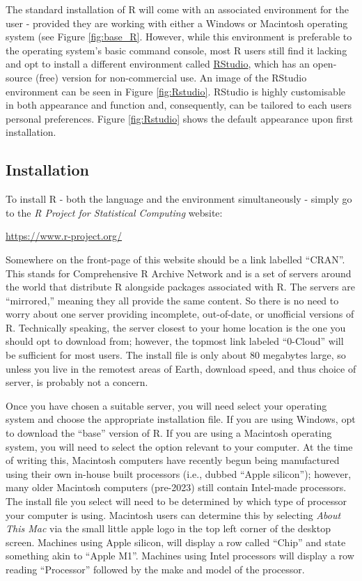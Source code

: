 The standard installation of R will come with an associated environment for the user - provided they are working with either a Windows or Macintosh operating system (see Figure \ref{fig:base_R}.  However, while this environment is preferable to the operating system's basic command console, most R users still find it lacking and opt to install a different environment called \href{https://posit.co/}{\gls{RStudio}}, which has an open-source (free) version for non-commercial use. An image of the RStudio environment can be seen in Figure \ref{fig:Rstudio}. RStudio is highly customisable in both appearance and function and, consequently, can be tailored to each users personal preferences. Figure \ref{fig:Rstudio} shows the default appearance upon first installation.

\subsection{Installation}
\label{sec:install}

To install R - both the language and the environment simultaneously - simply go to the \textit{R Project for Statistical Computing} website: 

\begin{center}
\url{https://www.r-project.org/}
\end{center}

\noindent
Somewhere on the front-page of this website should be a link labelled ``\acrshort{CRAN}''. This stands for \gls{Comprehensive R Archive Network} and is a set of servers around the world that distribute R alongside packages associated with R.  The servers are ``mirrored,'' meaning they all provide the same content.  So there is no need to worry about one server providing incomplete, out-of-date, or unofficial versions of R.  Technically speaking, the server closest to your home location is the one you should opt to download from; however, the topmost link labeled ``0-Cloud'' will be sufficient for most users.  The install file is only about 80 megabytes large, so unless you live in the remotest areas of Earth, download speed, and thus choice of server, is probably not a concern.

Once you have chosen a suitable server, you will need select your operating system and choose the appropriate installation file. If you are using Windows, opt to download the ``base'' version of R.  If you are using a Macintosh operating system, you will need to select the option relevant to your computer.  At the time of writing this, Macintosh computers have recently begun being manufactured using their own in-house built processors (i.e., dubbed ``Apple silicon''); however, many older Macintosh computers (pre-2023) still contain Intel-made processors. The install file you select will need to be determined by which type of processor your computer is using. Macintosh users can determine this by selecting \textit{About This Mac} via the small little apple logo in the top left corner of the desktop screen. Machines using Apple silicon, will display a row called ``Chip'' and state something akin to ``Apple M1''. Machines using Intel processors will display a row reading ``Processor'' followed by the make and model of the processor.


